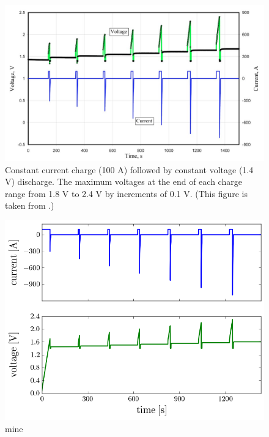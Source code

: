 \documentclass[10pt, oneside]{article}   	%
\begin{document}
\begin{figure}[h!]
    \centering
    \includegraphics[width=\textwidth]{figures/series_of_constant_current_charge_and_constant_voltage_discharge}
    \caption{
Constant current charge (100 A) followed by constant voltage (1.4 V)
discharge.  The maximum voltages at the end of each charge range from 1.8 V to
2.4 V by increments of 0.1 V.  (This figure is taken from \cite{Verbrugge2005}.)
    }
    \label{fig:series_of_constant_current_charge_and_constant_voltage_discharge}
\end{figure}

\begin{figure}[h!]
    \centering
    \includegraphics[width=\textwidth]{figures/constant_current_charge_constant_voltage_discharge_current_and_voltage}
    \caption{mine}
    \label{fig:constant_current_charge_constant_voltage_discharge_current_and_voltage}
\end{figure}
\end{document}
